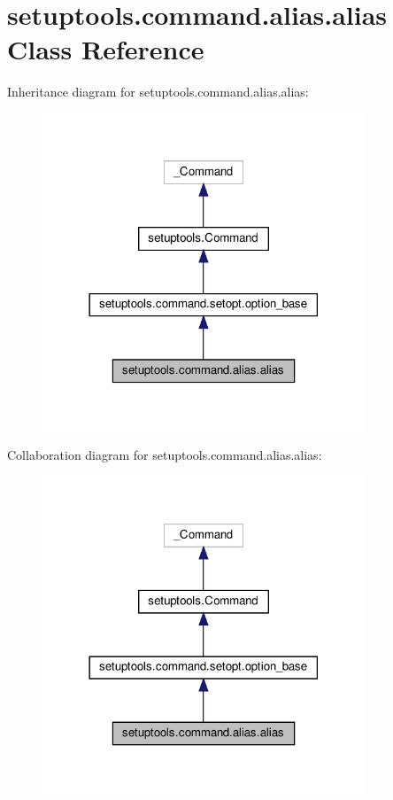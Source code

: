 \hypertarget{classsetuptools_1_1command_1_1alias_1_1alias}{}\section{setuptools.\+command.\+alias.\+alias Class Reference}
\label{classsetuptools_1_1command_1_1alias_1_1alias}


Inheritance diagram for setuptools.\+command.\+alias.\+alias\+:
\nopagebreak
\begin{figure}[H]
\begin{center}
\leavevmode
\includegraphics[width=273pt]{classsetuptools_1_1command_1_1alias_1_1alias__inherit__graph}
\end{center}
\end{figure}


Collaboration diagram for setuptools.\+command.\+alias.\+alias\+:
\nopagebreak
\begin{figure}[H]
\begin{center}
\leavevmode
\includegraphics[width=273pt]{classsetuptools_1_1command_1_1alias_1_1alias__coll__graph}
\end{center}
\end{figure}
